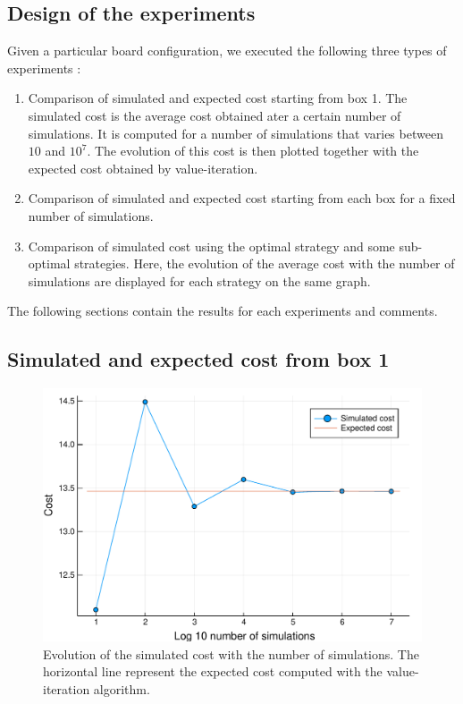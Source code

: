 \subsection{Design of the experiments}
Given a particular board configuration, we executed the following three types of experiments : 
\begin{enumerate}
	\item Comparison of simulated and expected cost starting from box 1.
	The simulated cost is the average cost obtained ater a certain number of simulations.
	It is computed for a number of simulations that varies between $10$ and $10^7$. 
	The evolution of this cost is then plotted together with the expected cost obtained by value-iteration.
	\item Comparison of simulated and expected cost starting from each box for a fixed number of simulations.
	\item Comparison of simulated cost using the optimal strategy and some sub-optimal strategies. 
	Here, the evolution of the average cost  with the number of simulations are displayed for each strategy on the same graph.
\end{enumerate}
The following sections contain the results for each experiments and comments.

\subsection{Simulated and expected cost from box 1}

\begin{figure}[H]
\centering
\includegraphics[scale=0.41]{../img/board_unif_low/cost_iterations_log.pdf}
\caption{Evolution of the simulated cost with the number of simulations. The horizontal line represent the expected cost computed with the value-iteration algorithm.}
\label{fig:cost_iterations_log}
\end{figure}


